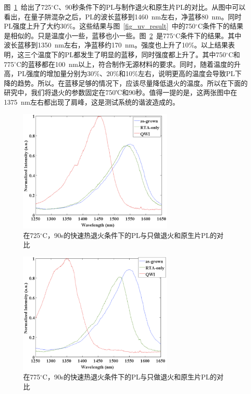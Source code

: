 \documentclass{ZJUthesis}
\begin{document}
图~\ref{fig_qwi_725C}~给出了725$^{\circ}$C、90秒条件下的PL与制作退火和原生片PL的对比。从图中可以看出，在量子阱混杂之后，PL的波长蓝移到1460~nm左右，净蓝移80~nm。同时PL强度上升了大约30\%。这些结果与图~\ref{fig_uv_result}~中的750$^{\circ}$C条件下的结果是相似的。只是温度小一些，蓝移也小一些。图~\ref{fig_qwi_775C}~是775$^{\circ}$C条件下的结果。其中波长蓝移到1350~nm左右，净蓝移约170~nm。强度也上升了10\%。以上结果表明，这三个温度下的PL都发生了明显的蓝移，同时强度都上升了。其中750$^{\circ}$C和775$^{\circ}$C的蓝移都在100~nm以上，符合制作无源材料的要求。同时，随着温度的升高，PL强度的增加量分别为30\%、20\%和10\%左右，说明更高的温度会导致PL下降的趋势。所以。在蓝移足够的情况下，应该尽量降低退火的温度。所以在下面的研究中，我们将退火的参数固定在750℃和90秒。值得一提的是，这两张图中在1375~nm左右都出现了肩峰，这是测试系统的谐波造成的。

\begin{figure}[htbp]
    \centering
    \includegraphics[width=0.7\textwidth]{./Pictures/qwi_725C.eps}
    \caption{在725$^{\circ}$C，90s的快速热退火条件下的PL与只做退火和原生片PL的对比}
    \label{fig_qwi_725C}
\end{figure}

\begin{figure}[htbp]
    \centering
    \includegraphics[width=0.7\textwidth]{./Pictures/qwi_775C.eps}
    \caption{在775$^{\circ}$C，90s的快速热退火条件下的PL与只做退火和原生片PL的对比}
    \label{fig_qwi_775C}
\end{figure}
\end{document}
